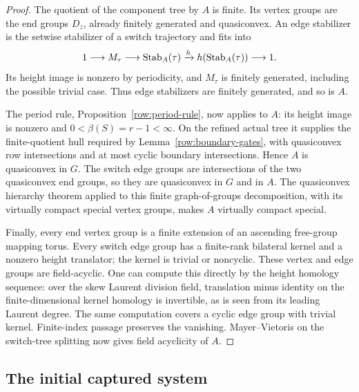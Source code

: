 \begin{proof}
The quotient of the component tree by $A$ is finite.  Its vertex groups
are the end groups $D_z$, already finitely generated and quasiconvex.
An edge stabilizer is the setwise stabilizer of a switch trajectory and
fits into
\[
 1\longrightarrow M_\tau\longrightarrow \operatorname{Stab}_A(\tau)
 \xrightarrow{h}h(\operatorname{Stab}_A(\tau))\longrightarrow1.
\]
Its height image is nonzero by periodicity, and $M_\tau$ is finitely
generated, including the possible trivial case.  Thus edge stabilizers
are finitely generated, and so is $A$.

The period rule, Proposition~\ref{row:period-rule}, now applies to $A$: its
height image is nonzero and $0<\beta(S)=r-1<\infty$.  On the refined
actual tree it supplies the finite-quotient hull required by
Lemma~\ref{row:boundary-gates}, with quasiconvex row intersections and
at most cyclic boundary intersections.  Hence $A$ is quasiconvex in $G$.
The switch edge groups are intersections of the two quasiconvex end groups,
so they are quasiconvex in $G$ and in $A$.  The quasiconvex hierarchy theorem
applied to this finite graph-of-groups decomposition, with its virtually
compact special vertex groups, makes $A$ virtually compact special.

Finally, every end vertex group is a finite extension of an ascending
free-group mapping torus.  Every switch edge group has a finite-rank
bilateral kernel and a nonzero height translator; the kernel is trivial
or noncyclic.  These vertex and edge groups are field-acyclic.  One can
compute this directly by the height homology sequence: over the skew
Laurent division field, translation minus identity on the finite-dimensional
kernel homology is invertible, as is seen from its leading Laurent degree.
The same computation covers a cyclic edge group with trivial kernel.
Finite-index passage preserves the vanishing.  Mayer--Vietoris on the
switch-tree splitting now gives field acyclicity of $A$.
\end{proof}

\subsection{The initial captured system}

